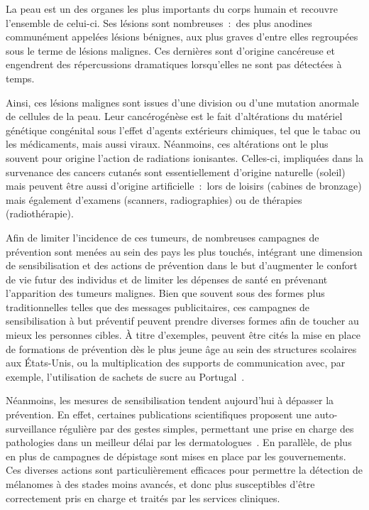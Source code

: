 \renewcommand{\thechapter}{\roman{chapter}}
\setcounter{chapter}{1}
\setcounter{figure}{0}

\label{chap:introduction}
La peau est un des organes les plus importants du corps humain et recouvre l'ensemble de celui-ci. Ses lésions sont nombreuses~:~des plus anodines communément appelées lésions bénignes, aux plus graves d'entre elles regroupées sous le terme de lésions malignes. Ces dernières sont d'origine cancéreuse et engendrent des répercussions dramatiques lorsqu'elles ne sont pas détectées à temps.\par

Ainsi, ces lésions malignes sont issues d’une division ou d’une mutation anormale de cellules de la peau. Leur cancérogénèse est le fait d'altérations du matériel génétique congénital sous l'effet d'agents extérieurs chimiques, tel que le tabac ou les médicaments, mais aussi viraux. Néanmoins, ces altérations ont le plus souvent pour origine l'action de radiations ionisantes. Celles-ci, impliquées dans la survenance des cancers cutanés sont essentiellement d'origine naturelle (soleil) mais peuvent être aussi d'origine artificielle~:~lors de loisirs (cabines de bronzage) mais également d'examens (scanners, radiographies) ou de thérapies (radiothérapie).\par

Afin de limiter l’incidence de ces tumeurs, de nombreuses campagnes de prévention sont menées au sein des pays les plus touchés, intégrant une dimension de sensibilisation et des actions de prévention dans le but d’augmenter le confort de vie futur des individus et de limiter les dépenses de santé en prévenant l'apparition des tumeurs malignes. Bien que souvent sous des formes plus traditionnelles telles que des messages publicitaires, ces campagnes de sensibilisation à but préventif peuvent prendre diverses formes afin de toucher au mieux les personnes cibles. À titre d’exemples, peuvent être cités la mise en place de formations de prévention dès le plus jeune âge au sein des structures scolaires aux États-Unis, ou la multiplication des supports de communication avec, par exemple, l’utilisation de sachets de sucre au Portugal~\cite{Guy2016,Correia2017}.\par 

Néanmoins, les mesures de sensibilisation tendent aujourd’hui à dépasser la prévention. En effet, certaines publications scientifiques proposent une auto-surveillance régulière par des gestes simples, permettant une prise en charge des pathologies dans un meilleur délai par les dermatologues~\cite{Friedman1985}. En parallèle, de plus en plus de campagnes de dépistage sont mises en place par les gouvernements. Ces diverses actions sont particulièrement efficaces pour permettre la détection de mélanomes à des stades moins avancés, et donc plus susceptibles d'être correctement pris en charge et traités par les services cliniques.\par

